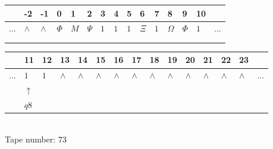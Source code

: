 \documentclass[11pt]{article}
\begin{document}
\begin{table}[H]
\centering
\begin{tabular}{lllllllllllllll}
 & -2 & -1 & 0 & 1 & 2 & 3 & 4 & 5 & 6 & 7 & 8 & 9 & 10 & \\
\hline
$...$ & \multicolumn{1}{|l|}{$\wedge$} & \multicolumn{1}{|l|}{$\wedge$} & \multicolumn{1}{|l|}{$\Phi$} & \multicolumn{1}{|l|}{$M$} & \multicolumn{1}{|l|}{$\Psi$} & \multicolumn{1}{|l|}{$1$} & \multicolumn{1}{|l|}{$1$} & \multicolumn{1}{|l|}{$1$} & \multicolumn{1}{|l|}{$\Xi$} & \multicolumn{1}{|l|}{$1$} & \multicolumn{1}{|l|}{$\Omega$} & \multicolumn{1}{|l|}{$\Phi$} & \multicolumn{1}{|l|}{$1$} & $...$\\
\hline
&  &  &  &  &  &  &  &  &  &  &  &  &  &  \\
&  &  &  &  &  &  &  &  &  &  &  &  &  &  \\
\end{tabular}
\begin{tabular}{lllllllllllllll}
 & 11 & 12 & 13 & 14 & 15 & 16 & 17 & 18 & 19 & 20 & 21 & 22 & 23 & \\
\hline
$...$ & \multicolumn{1}{|l|}{$1$} & \multicolumn{1}{|l|}{$1$} & \multicolumn{1}{|l|}{$\wedge$} & \multicolumn{1}{|l|}{$\wedge$} & \multicolumn{1}{|l|}{$\wedge$} & \multicolumn{1}{|l|}{$\wedge$} & \multicolumn{1}{|l|}{$\wedge$} & \multicolumn{1}{|l|}{$\wedge$} & \multicolumn{1}{|l|}{$\wedge$} & \multicolumn{1}{|l|}{$\wedge$} & \multicolumn{1}{|l|}{$\wedge$} & \multicolumn{1}{|l|}{$\wedge$} & \multicolumn{1}{|l|}{$\wedge$} & $...$\\
\hline
& $\uparrow$ &  &  &  &  &  &  &  &  &  &  &  &  &  \\
& $ q8 $ &  &  &  &  &  &  &  &  &  &  &  &  &  \\
\end{tabular}
\\
Tape number: 73
\noindent\makebox[\linewidth]{\hdashrule{\textwidth}{1pt}{1pt}}\end{table}
\end{document}

